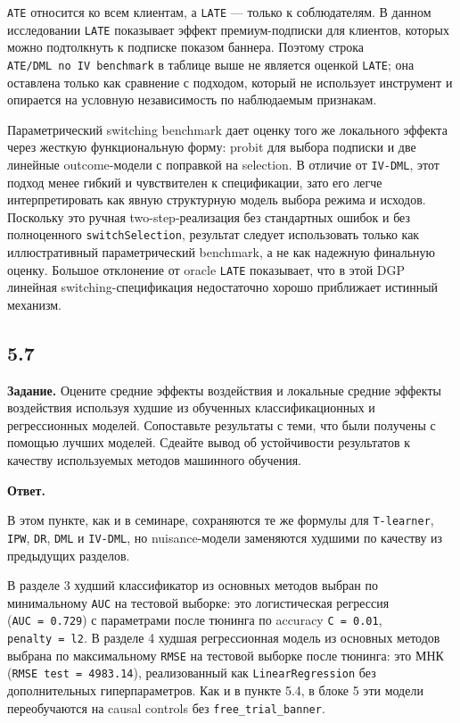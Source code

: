 \documentclass[11pt]{article}
\begin{document}
    \texttt{ATE} относится ко всем клиентам, а \texttt{LATE} --- только к
соблюдателям. В данном исследовании \texttt{LATE} показывает эффект
премиум-подписки для клиентов, которых можно подтолкнуть к подписке
показом баннера. Поэтому строка \texttt{ATE/DML\ no\ IV\ benchmark} в
таблице выше не является оценкой \texttt{LATE}; она оставлена только как
сравнение с подходом, который не использует инструмент и опирается на
условную независимость по наблюдаемым признакам.

Параметрический switching benchmark дает оценку того же локального
эффекта через жесткую функциональную форму: probit для выбора подписки и
две линейные outcome-модели с поправкой на selection. В отличие от
\texttt{IV-DML}, этот подход менее гибкий и чувствителен к спецификации,
зато его легче интерпретировать как явную структурную модель выбора
режима и исходов. Поскольку это ручная two-step-реализация без
стандартных ошибок и без полноценного \texttt{switchSelection},
результат следует использовать только как иллюстративный параметрический
benchmark, а не как надежную финальную оценку. Большое отклонение от
oracle \texttt{LATE} показывает, что в этой DGP линейная
switching-спецификация недостаточно хорошо приближает истинный механизм.

    \subsection{5.7}\label{section}

\textbf{Задание.} Оцените средние эффекты воздействия и локальные
средние эффекты воздействия используя худшие из обученных
классификационных и регрессионных моделей. Сопоставьте результаты с
теми, что были получены с помощью лучших моделей. Сдеайте вывод об
устойчивости результатов к качеству используемых методов машинного
обучения.

\textbf{Ответ.}

В этом пункте, как и в семинаре, сохраняются те же формулы для
\texttt{T-learner}, \texttt{IPW}, \texttt{DR}, \texttt{DML} и
\texttt{IV-DML}, но nuisance-модели заменяются худшими по качеству из
предыдущих разделов.

В разделе 3 худший классификатор из основных методов выбран по
минимальному \texttt{AUC} на тестовой выборке: это логистическая
регрессия (\texttt{AUC\ =\ 0.729}) с параметрами после тюнинга по
accuracy \texttt{C\ =\ 0.01},
\texttt{penalty\ =\ \textquotesingle{}l2\textquotesingle{}}. В разделе 4
худшая регрессионная модель из основных методов выбрана по максимальному
\texttt{RMSE} на тестовой выборке после тюнинга: это МНК
(\texttt{RMSE\ test\ =\ 4983.14}), реализованный как
\texttt{LinearRegression} без дополнительных гиперпараметров. Как и в
пункте 5.4, в блоке 5 эти модели переобучаются на causal controls без
\texttt{free\_trial\_banner}.
\end{document}
